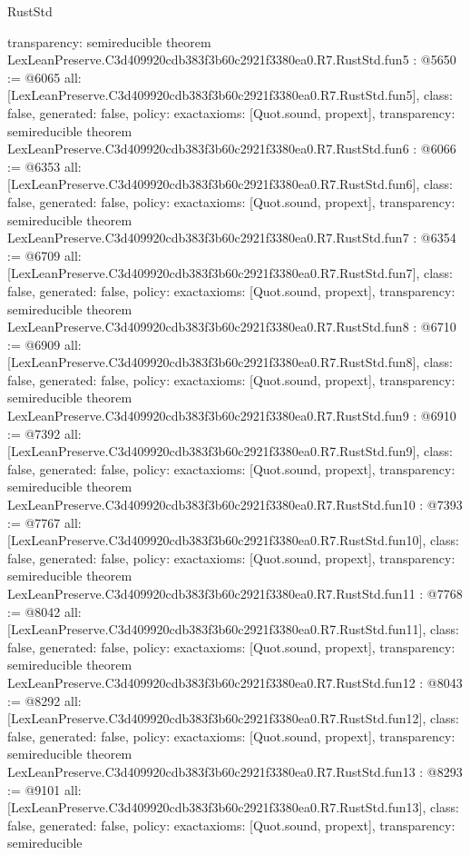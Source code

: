 \begin{lexlean}{RustStd}
\begin{coremodule}
{  transparency: semireducible
}
theorem LexLeanPreserve.C3d409920cdb383f3b60c2921f3380ea0.R7.RustStd.fun5 : @5650 := @6065 {
  all: [LexLeanPreserve.C3d409920cdb383f3b60c2921f3380ea0.R7.RustStd.fun5],
  class: false,
  generated: false,
  policy: exact{axioms: [Quot.sound, propext]},
  transparency: semireducible
}
theorem LexLeanPreserve.C3d409920cdb383f3b60c2921f3380ea0.R7.RustStd.fun6 : @6066 := @6353 {
  all: [LexLeanPreserve.C3d409920cdb383f3b60c2921f3380ea0.R7.RustStd.fun6],
  class: false,
  generated: false,
  policy: exact{axioms: [Quot.sound, propext]},
  transparency: semireducible
}
theorem LexLeanPreserve.C3d409920cdb383f3b60c2921f3380ea0.R7.RustStd.fun7 : @6354 := @6709 {
  all: [LexLeanPreserve.C3d409920cdb383f3b60c2921f3380ea0.R7.RustStd.fun7],
  class: false,
  generated: false,
  policy: exact{axioms: [Quot.sound, propext]},
  transparency: semireducible
}
theorem LexLeanPreserve.C3d409920cdb383f3b60c2921f3380ea0.R7.RustStd.fun8 : @6710 := @6909 {
  all: [LexLeanPreserve.C3d409920cdb383f3b60c2921f3380ea0.R7.RustStd.fun8],
  class: false,
  generated: false,
  policy: exact{axioms: [Quot.sound, propext]},
  transparency: semireducible
}
theorem LexLeanPreserve.C3d409920cdb383f3b60c2921f3380ea0.R7.RustStd.fun9 : @6910 := @7392 {
  all: [LexLeanPreserve.C3d409920cdb383f3b60c2921f3380ea0.R7.RustStd.fun9],
  class: false,
  generated: false,
  policy: exact{axioms: [Quot.sound, propext]},
  transparency: semireducible
}
theorem LexLeanPreserve.C3d409920cdb383f3b60c2921f3380ea0.R7.RustStd.fun10 : @7393 := @7767 {
  all: [LexLeanPreserve.C3d409920cdb383f3b60c2921f3380ea0.R7.RustStd.fun10],
  class: false,
  generated: false,
  policy: exact{axioms: [Quot.sound, propext]},
  transparency: semireducible
}
theorem LexLeanPreserve.C3d409920cdb383f3b60c2921f3380ea0.R7.RustStd.fun11 : @7768 := @8042 {
  all: [LexLeanPreserve.C3d409920cdb383f3b60c2921f3380ea0.R7.RustStd.fun11],
  class: false,
  generated: false,
  policy: exact{axioms: [Quot.sound, propext]},
  transparency: semireducible
}
theorem LexLeanPreserve.C3d409920cdb383f3b60c2921f3380ea0.R7.RustStd.fun12 : @8043 := @8292 {
  all: [LexLeanPreserve.C3d409920cdb383f3b60c2921f3380ea0.R7.RustStd.fun12],
  class: false,
  generated: false,
  policy: exact{axioms: [Quot.sound, propext]},
  transparency: semireducible
}
theorem LexLeanPreserve.C3d409920cdb383f3b60c2921f3380ea0.R7.RustStd.fun13 : @8293 := @9101 {
  all: [LexLeanPreserve.C3d409920cdb383f3b60c2921f3380ea0.R7.RustStd.fun13],
  class: false,
  generated: false,
  policy: exact{axioms: [Quot.sound, propext]},
  transparency: semireducible
}
\end{coremodule}
\end{lexlean}
